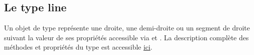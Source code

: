\documentclass[pdftex]{article}
\begin{document}
\subsection{Le type \texorpdfstring{\og{}line\fg{}}{line}}
Un objet de type  représente une droite, une demi-droite ou
un segment de droite suivant la valeur de ses propriétés
 accessible via  et
.
La description complète des méthodes et
propriétés du type  est accessible
\href{http://piprim.tuxfamily.org/asymptote/geometry/modules/geometry.asy.index.sign.html#struct\%20line}{ici}.
\end{document}
